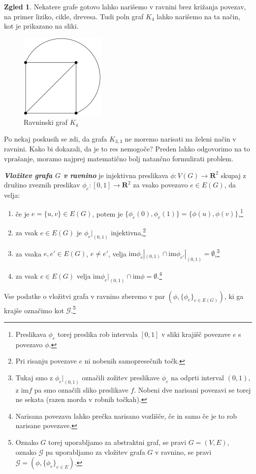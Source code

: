 \documentclass[11pt]{book}
\def\RR{\mathbf{R}}
\def\GG{\mathcal{G}}
\def\definicija{\color{rdeca}\bf\em}
\theoremstyle{definition}
\theoremstyle{zgled}
\newtheorem*{zgled}{Zgled}
\theoremstyle{odprtproblem}
\theoremstyle{domacanaloga}
\theoremstyle{izrek}
\begin{document}
\begin{zgled}
    Nekatere grafe gotovo lahko narišemo v ravnini brez križanja povezav, na primer liziko, cikle, drevesa. Tudi poln graf $K_4$ lahko narišemo na ta način, kot je prikazano na sliki.

    \begin{figure}[h]
        \centering
        \includegraphics[width=0.5\linewidth]{img/grafi-ravninski-k4.png}
        \caption{Ravninski graf $K_4$}
    \end{figure}    
\end{zgled}

Po nekaj poskusih se zdi, da grafa $K_{3,3}$ ne moremo narisati na želeni način v ravnini. Kako bi dokazali, da je to res nemogoče? Preden lahko odgovorimo na to vprašanje, moramo najprej matematično bolj natančno formulirati problem.

{\definicija Vložitev grafa $G$ v ravnino} je injektivna preslikava $\phi \colon V(G) \to \RR^2$ skupaj z družino zveznih preslikav $\phi_e \colon [0,1] \to \RR^2$ za vsako povezavo $e \in E(G)$, da velja:
\begin{enumerate}
    \item če je $e = \{ u,v \} \in E(G)$, potem je $\{ \phi_e(0), \phi_e(1) \} = \{ \phi(u), \phi(v) \}$,\footnote{Preslikava $\phi_e$ torej preslika rob intervala $[0,1]$ v sliki krajišč povezave $e$ s povezavo $\phi$.}
    \item za vsak $e \in E(G)$ je $\phi_e|_{(0,1)}$ injektivna,\footnote{Pri risanju povezave $e$ ni nobenih samopresečnih točk.}
    \item za vsaka $e, e' \in E(G)$, $e \neq e'$, velja $\mathrm{im} \phi_e|_{(0,1)} \cap \mathrm{im} \phi_{e'}|_{(0,1)} = \emptyset$,\footnote{Tukaj smo z $\phi_e |_{(0,1)}$ označili zožitev preslikave $\phi_e$ na odprti interval $(0,1)$, z $\mathrm{im} f$ pa smo označili sliko preslikave $f$. Nobeni dve narisani povezavi se torej ne sekata (razen morda v robnih točkah).}
    \item za vsak $e \in E(G)$ velja $\mathrm{im} \phi_e|_{(0,1)} \cap \mathrm{im} \phi = \emptyset$.\footnote{Narisana povezava lahko prečka narisano vozlišče, če in samo če je to rob narisane povezave.}
\end{enumerate}
Vse podatke o vložitvi grafa v ravnino zberemo v par $(\phi, \{ \phi_e \}_{e \in E(G)})$, ki ga krajše označimo kot $\GG$.\footnote{Oznako $G$ torej uporabljamo za abstraktni graf, se pravi $G = (V,E)$, oznako $\GG$ pa uporabljamo za vložitev grafa $G$ v ravnino, se pravi $\GG = (\phi, \{ \phi_e \}_{e \in E})$.}
    
\end{document}

